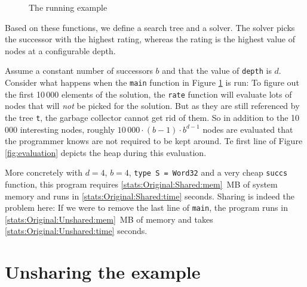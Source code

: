 \documentclass[preprint]{sigplanconf}
\theoremstyle{nonumberplain}
\newcommand{\li}{\lstinline[style=Haskell]}
\begin{document}
\begin{figure}
\caption{The running example}
\label{fig:ex}
\end{figure}

Based on these functions, we define a search tree and a solver. The solver picks the successor with the highest rating, whereas the rating is the highest value of nodes at a configurable depth.

Assume a constant number of successors $b$ and that the value of \li-depth- is $d$. Consider what happens when the \li-main- function in Figure \ref{fig:ex} is run: To figure out the first 10\,000 elements of the solution, the \li-rate- function will evaluate lots of nodes that will \emph{not} be picked for the solution. But as they are still referenced by the tree \li-t-, the garbage collector cannot get rid of them. So in addition to the  10\,000 interesting nodes, roughly $10\,000\cdot (b-1)\cdot b^{d-1}$ nodes are evaluated that the programmer knows are not required to be kept around. Te first line of Figure \ref{fig:evaluation} depicts the heap during this evaluation.

More concretely with $d=4$, $b=4$, \li-type S = Word32- and a very cheap \li-succs- function, this program requires \ref{stats:Original:Shared:mem}~MB of system memory and runs in \ref{stats:Original:Shared:time} seconds. Sharing is indeed the problem here: If we were to remove the last line of \li-main-, the program runs in \ref{stats:Original:Unshared:mem}~MB of memory and takes \ref{stats:Original:Unshared:time} seconds.

\section{Unsharing the example}
\label{sec:unsharing}
\end{document}
